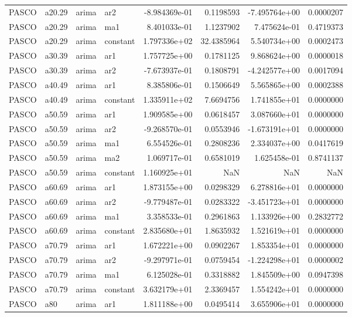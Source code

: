 \documentclass[
]{article}
\begin{document}
\begin{table}[!h]
\begin{tabular}[t]{llllrrrr}
PASCO & a20.29 & arima & ar2 & -8.984369e-01 & 0.1198593 & -7.495764e+00 & 0.0000207\\
PASCO & a20.29 & arima & ma1 & 8.401033e-01 & 1.1237902 & 7.475624e-01 & 0.4719373\\
PASCO & a20.29 & arima & constant & 1.797336e+02 & 32.4385964 & 5.540734e+00 & 0.0002473\\
\addlinespace
PASCO & a30.39 & arima & ar1 & 1.757725e+00 & 0.1781125 & 9.868624e+00 & 0.0000018\\
PASCO & a30.39 & arima & ar2 & -7.673937e-01 & 0.1808791 & -4.242577e+00 & 0.0017094\\
PASCO & a40.49 & arima & ar1 & 8.385806e-01 & 0.1506649 & 5.565865e+00 & 0.0002388\\
PASCO & a40.49 & arima & constant & 1.335911e+02 & 7.6694756 & 1.741855e+01 & 0.0000000\\
PASCO & a50.59 & arima & ar1 & 1.909585e+00 & 0.0618457 & 3.087660e+01 & 0.0000000\\
\addlinespace
PASCO & a50.59 & arima & ar2 & -9.268570e-01 & 0.0553946 & -1.673191e+01 & 0.0000000\\
PASCO & a50.59 & arima & ma1 & 6.554526e-01 & 0.2808236 & 2.334037e+00 & 0.0417619\\
PASCO & a50.59 & arima & ma2 & 1.069717e-01 & 0.6581019 & 1.625458e-01 & 0.8741137\\
PASCO & a50.59 & arima & constant & 1.160925e+01 & NaN & NaN & NaN\\
PASCO & a60.69 & arima & ar1 & 1.873155e+00 & 0.0298329 & 6.278816e+01 & 0.0000000\\
\addlinespace
PASCO & a60.69 & arima & ar2 & -9.779487e-01 & 0.0283322 & -3.451723e+01 & 0.0000000\\
PASCO & a60.69 & arima & ma1 & 3.358533e-01 & 0.2961863 & 1.133926e+00 & 0.2832772\\
PASCO & a60.69 & arima & constant & 2.835680e+01 & 1.8635932 & 1.521619e+01 & 0.0000000\\
PASCO & a70.79 & arima & ar1 & 1.672221e+00 & 0.0902267 & 1.853354e+01 & 0.0000000\\
PASCO & a70.79 & arima & ar2 & -9.297971e-01 & 0.0759454 & -1.224298e+01 & 0.0000002\\
\addlinespace
PASCO & a70.79 & arima & ma1 & 6.125028e-01 & 0.3318882 & 1.845509e+00 & 0.0947398\\
PASCO & a70.79 & arima & constant & 3.632179e+01 & 2.3369457 & 1.554242e+01 & 0.0000000\\
PASCO & a80 & arima & ar1 & 1.811188e+00 & 0.0495414 & 3.655906e+01 & 0.0000000\\

\end{tabular}
\end{table}
\end{document}
